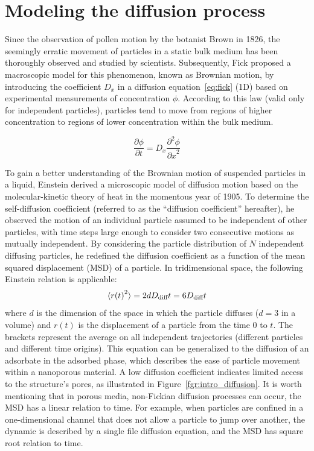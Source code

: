 \documentclass[main]{subfiles}
\begin{document}
\section{Modeling the diffusion process}

Since the observation of pollen motion by the botanist Brown in 1826, the seemingly erratic movement of particles in a static bulk medium has been thoroughly observed and studied by scientists. Subsequently, Fick proposed a macroscopic model for this phenomenon, known as Brownian motion, by introducing the coefficient $D_x$ in a diffusion equation~\ref{eq:fick} (1D) based on experimental measurements of concentration $\phi$.\autocite{Fick_1855} According to this law (valid only for independent particles), particles tend to move from regions of higher concentration to regions of lower concentration within the bulk medium.

\begin{equation}\label{eq:fick}
  \frac{\partial \phi}{\partial t} = D_x \frac{\partial^2 \phi}{{\partial x}^2}
\end{equation}

To gain a better understanding of the Brownian motion of suspended particles in a liquid, Einstein derived a microscopic model of diffusion motion based on the molecular-kinetic theory of heat in the momentous year of 1905.\autocite{einstein1905motion} To determine the self-diffusion coefficient (referred to as the ``diffusion coefficient'' hereafter), he observed the motion of an individual particle assumed to be independent of other particles, with time steps large enough to consider two consecutive motions as mutually independent. By considering the particle distribution of $N$ independent diffusing particles, he redefined the diffusion coefficient as a function of the mean squared displacement (MSD) of a particle. In tridimensional space, the following Einstein relation is applicable:
\begin{equation}\label{eq:einstein}
  \langle {r(t)}^2 \rangle = 2dD_{\text{diff}}t = 6D_{\text{diff}}t
\end{equation}
where  $d$ is the dimension of the space in which the particle diffuses ($d=3$ in a volume) and $r(t)$ is the displacement of a particle from the time $0$ to $t$. The brackets represent the average on all independent trajectories (different particles and different time origins). This equation can be generalized to the diffusion of an adsorbate in the adsorbed phase, which describes the ease of particle movement within a nanoporous material. A low diffusion coefficient indicates limited access to the structure's pores, as illustrated in Figure~\ref{fgr:intro_diffusion}. It is worth mentioning that in porous media, non-Fickian diffusion processes can occur, the MSD has a linear relation to time. For example, when particles are confined in a one-dimensional channel that does not allow a particle to jump over another, the dynamic is described by a single file diffusion equation, and the MSD has square root relation to time.\autocite{Levitt_1973}
\end{document}
